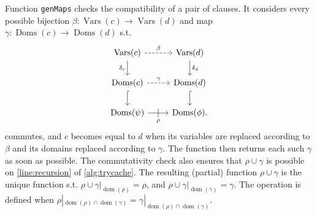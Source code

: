 \documentclass{article}
\theoremstyle{definition}
\DeclareMathOperator{\dom}{dom}
\DeclareMathOperator{\Doms}{Doms}
\DeclareMathOperator{\Vars}{Vars}
\begin{document}
Function \texttt{genMaps} checks the compatibility of a pair of clauses. It
considers every possible bijection $\beta\colon \Vars(c) \to \Vars(d)$ and map
$\gamma\colon \Doms(c) \to \Doms(d)$ s.t.
\[
  \begin{tikzcd}
    \Vars(c) \ar[r, dashed, "\beta"] \arrow[d, swap, "\delta_c"] & \Vars(d) \ar[d, "\delta_d"] \\
    \Doms(c) \ar[r, dashed, "\gamma"] \ar[d, hookrightarrow] & \Doms(d) \ar[d, hookrightarrow] \\
    \Doms(\psi) \ar[r, swap, "\rho", "|" marking, outer sep=5pt] & \Doms(\phi).
  \end{tikzcd}
\]
commutes, and $c$ becomes equal to $d$ when its variables are replaced according
to $\beta$ and its domains replaced according to $\gamma$. The function then
returns each such $\gamma$ as soon as possible. The commutativity check also
ensures that $\rho \cup \gamma$ is possible on \cref{line:recursion} of
\cref{alg:trycache}. The resulting (partial) function $\rho \cup \gamma$ is the
unique function s.t. $\rho \cup \gamma|_{\dom(\rho)} = \rho$, and
$\rho \cup \gamma|_{\dom(\gamma)} = \gamma$. The operation is defined when
$\rho|_{\dom(\rho)\cap\dom(\gamma)} = \gamma|_{\dom(\rho)\cap\dom(\gamma)}$.
\end{document}
